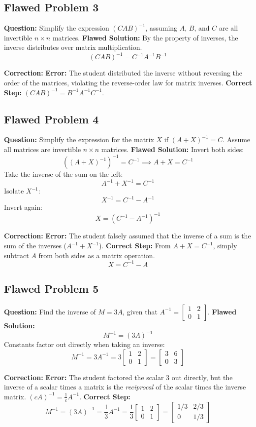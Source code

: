 \documentclass[12pt]{article}
\begin{document}
\subsection{Flawed Problem 3}
\textbf{Question:} Simplify the expression $(C A B)^{-1}$, assuming $A$, $B$, and $C$ are all invertible $n \times n$ matrices.
\textbf{Flawed Solution:}
By the property of inverses, the inverse distributes over matrix multiplication.
\[ (C A B)^{-1} = C^{-1} A^{-1} B^{-1} \]

\textbf{Correction:}
\textbf{Error:} The student distributed the inverse without reversing the order of the matrices, violating the reverse-order law for matrix inverses.
\textbf{Correct Step:} $(C A B)^{-1} = B^{-1} A^{-1} C^{-1}$.

\subsection{Flawed Problem 4}
\textbf{Question:} Simplify the expression for the matrix $X$ if $(A + X)^{-1} = C$. Assume all matrices are invertible $n \times n$ matrices.
\textbf{Flawed Solution:}
Invert both sides:
\[ ((A + X)^{-1})^{-1} = C^{-1} \implies A + X = C^{-1} \]
Take the inverse of the sum on the left:
\[ A^{-1} + X^{-1} = C^{-1} \]
Isolate $X^{-1}$:
\[ X^{-1} = C^{-1} - A^{-1} \]
Invert again:
\[ X = (C^{-1} - A^{-1})^{-1} \]

\textbf{Correction:}
\textbf{Error:} The student falsely assumed that the inverse of a sum is the sum of the inverses ($A^{-1} + X^{-1}$).
\textbf{Correct Step:} From $A + X = C^{-1}$, simply subtract $A$ from both sides as a matrix operation.
\[ X = C^{-1} - A \]

\subsection{Flawed Problem 5}
\textbf{Question:} Find the inverse of $M = 3A$, given that $A^{-1} = \begin{bmatrix} 1 & 2 \\ 0 & 1 \end{bmatrix}$.
\textbf{Flawed Solution:}
\[ M^{-1} = (3A)^{-1} \]
Constants factor out directly when taking an inverse:
\[ M^{-1} = 3 A^{-1} = 3 \begin{bmatrix} 1 & 2 \\ 0 & 1 \end{bmatrix} = \begin{bmatrix} 3 & 6 \\ 0 & 3 \end{bmatrix} \]

\textbf{Correction:}
\textbf{Error:} The student factored the scalar $3$ out directly, but the inverse of a scalar times a matrix is the \textit{reciprocal} of the scalar times the inverse matrix. $(cA)^{-1} = \frac{1}{c}A^{-1}$.
\textbf{Correct Step:}
\[ M^{-1} = (3A)^{-1} = \frac{1}{3} A^{-1} = \frac{1}{3} \begin{bmatrix} 1 & 2 \\ 0 & 1 \end{bmatrix} = \begin{bmatrix} 1/3 & 2/3 \\ 0 & 1/3 \end{bmatrix} \]
\end{document}
